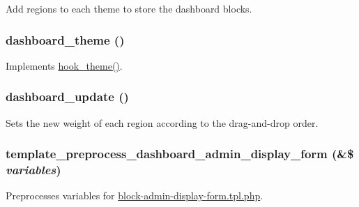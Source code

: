 Add regions to each theme to store the dashboard blocks. \hypertarget{dashboard_8module_a5eb2465436208886f8f72abfb1c7a540}{
\subsubsection[{dashboard\_\-theme}]{\setlength{\rightskip}{0pt plus 5cm}dashboard\_\-theme ()}}
\label{dashboard_8module_a5eb2465436208886f8f72abfb1c7a540}
Implements \hyperlink{group__hooks_ga013ccb45c7aaab1c16cf9691428c910d}{hook\_\-theme()}. \hypertarget{dashboard_8module_a9e4047a9a86d0c8ae438a3f4e61c9a81}{
\subsubsection[{dashboard\_\-update}]{\setlength{\rightskip}{0pt plus 5cm}dashboard\_\-update ()}}
\label{dashboard_8module_a9e4047a9a86d0c8ae438a3f4e61c9a81}
Sets the new weight of each region according to the drag-\/and-\/drop order. \hypertarget{dashboard_8module_addaee36bd5501ed3c8fbefa12a866f22}{
\subsubsection[{template\_\-preprocess\_\-dashboard\_\-admin\_\-display\_\-form}]{\setlength{\rightskip}{0pt plus 5cm}template\_\-preprocess\_\-dashboard\_\-admin\_\-display\_\-form (\&\$ {\em variables})}}
\label{dashboard_8module_addaee36bd5501ed3c8fbefa12a866f22}
Preprocesses variables for \hyperlink{block-admin-display-form_8tpl_8php}{block-\/admin-\/display-\/form.tpl.php}. 